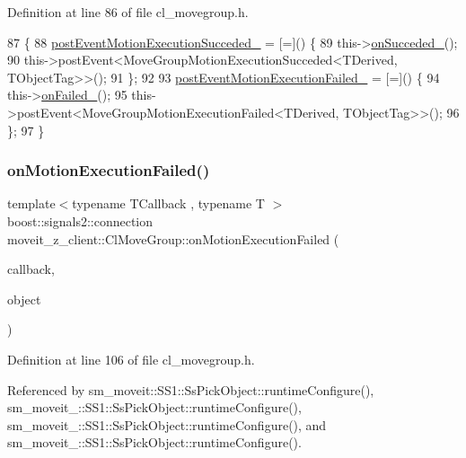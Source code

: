 Definition at line 86 of file cl\+\_\+movegroup.\+h.


\begin{DoxyCode}
87   \{
88     \hyperlink{classmoveit__z__client_1_1ClMoveGroup_a9234c0edadb1f173c31fc8fa5430afcd}{postEventMotionExecutionSucceded\_} = [=]() \{
89       this->\hyperlink{classmoveit__z__client_1_1ClMoveGroup_a77804970cc1e2ae64e26dabbf556352d}{onSucceded\_}();
90       this->postEvent<MoveGroupMotionExecutionSucceded<TDerived, TObjectTag>>();
91     \};
92 
93     \hyperlink{classmoveit__z__client_1_1ClMoveGroup_afecfdc1860dffea3331379b90d608154}{postEventMotionExecutionFailed\_} = [=]() \{
94       this->\hyperlink{classmoveit__z__client_1_1ClMoveGroup_ab9f19c609cfa111748bc16d497dffe9a}{onFailed\_}();
95       this->postEvent<MoveGroupMotionExecutionFailed<TDerived, TObjectTag>>();
96     \};
97   \}
\end{DoxyCode}
\mbox{\label{classmoveit__z__client_1_1ClMoveGroup_a1a80f1f29d5be0ff115cbedb8c80afd8}} 
\subsubsection{\texorpdfstring{on\+Motion\+Execution\+Failed()}{onMotionExecutionFailed()}}
{\footnotesize\ttfamily template$<$typename T\+Callback , typename T $>$ \\
boost\+::signals2\+::connection moveit\+\_\+z\+\_\+client\+::\+Cl\+Move\+Group\+::on\+Motion\+Execution\+Failed (\begin{DoxyParamCaption}\item[{T\+Callback}]{callback,  }\item[{T $\ast$}]{object }\end{DoxyParamCaption})\hspace{0.3cm}{\ttfamily [inline]}}



Definition at line 106 of file cl\+\_\+movegroup.\+h.



Referenced by sm\+\_\+moveit\+::\+S\+S1\+::\+Ss\+Pick\+Object\+::runtime\+Configure(), sm\+\_\+moveit\+\_\+::\+S\+S1\+::\+Ss\+Pick\+Object\+::runtime\+Configure(), sm\+\_\+moveit\+\_\+::\+S\+S1\+::\+Ss\+Pick\+Object\+::runtime\+Configure(), and sm\+\_\+moveit\+\_\+::\+S\+S1\+::\+Ss\+Pick\+Object\+::runtime\+Configure().


